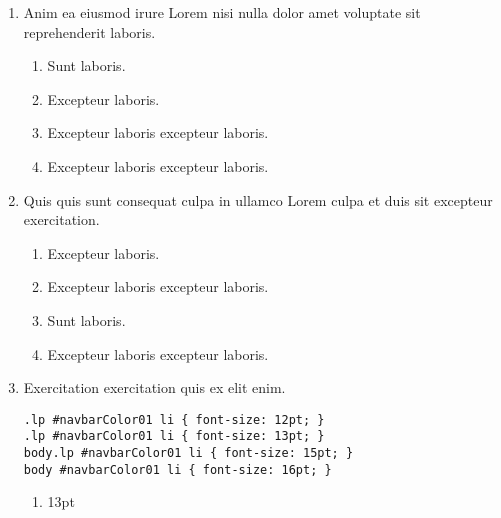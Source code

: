 \documentclass[a4paper,12pt]{article}
\begin{document}
\begin{enumerate}[label=\textbf{\arabic*.}]
\begin{multicols}{2}
\begin{enumerate}
		\item  Excepteur laboris excepteur laboris.
  
		\item  Excepteur laboris excepteur laboris.
    
	\end{enumerate}

\end{multicols}
\item Anim ea eiusmod irure Lorem nisi nulla dolor amet voluptate sit reprehenderit laboris.
\begin{multicols}{2}
	\begin{enumerate}
		\item  Sunt laboris.
    
		\item  Excepteur laboris.
    
		\item  Excepteur laboris excepteur laboris.
    
		\item  Excepteur laboris excepteur laboris.
  
	\end{enumerate}

\end{multicols}
\item Quis quis sunt consequat culpa in ullamco Lorem culpa et duis sit excepteur exercitation.
\begin{multicols}{2}
	\begin{enumerate}
		\item  Excepteur laboris.
    
		\item  Excepteur laboris excepteur laboris.
    
		\item  Sunt laboris.
    
		\item  Excepteur laboris excepteur laboris.
  
	\end{enumerate}

\end{multicols}
\item Exercitation exercitation quis ex elit enim.
  
  \begin{minipage}{\textwidth} %
  \begin{lstlisting}
.lp #navbarColor01 li { font-size: 12pt; }
.lp #navbarColor01 li { font-size: 13pt; }
body.lp #navbarColor01 li { font-size: 15pt; }
body #navbarColor01 li { font-size: 16pt; }
  \end{lstlisting}
  \end{minipage}
\begin{multicols}{2}
	\begin{enumerate}
		\item  13pt
    

\end{enumerate}
\end{multicols}
\end{enumerate}
\end{document}

